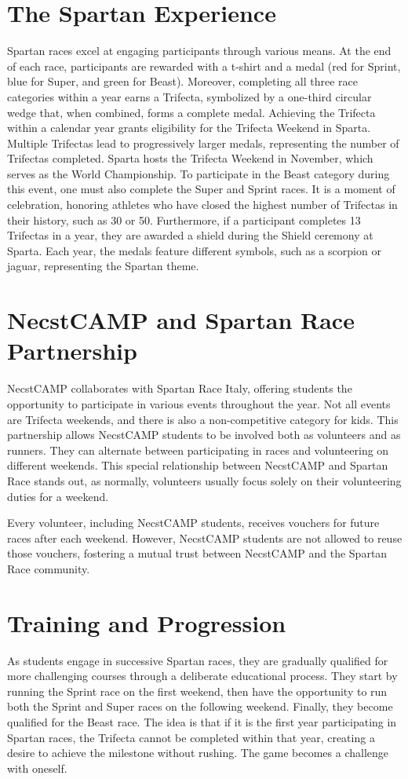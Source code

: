\documentclass[12pt,oneside,a4paper]{article}
\begin{document}
\section{The Spartan Experience} \label{sec:spexp}
Spartan races excel at engaging participants through various means. At the end of each race, participants are rewarded with a t-shirt and a medal (red for Sprint, blue for Super, and green for Beast). Moreover, completing all three race categories within a year earns a Trifecta, symbolized by a one-third circular wedge that, when combined, forms a complete medal. Achieving the Trifecta within a calendar year grants eligibility for the Trifecta Weekend in Sparta. Multiple Trifectas lead to progressively larger medals, representing the number of Trifectas completed. Sparta hosts the Trifecta Weekend in November, which serves as the World Championship. To participate in the Beast category during this event, one must also complete the Super and Sprint races. It is a moment of celebration, honoring athletes who have closed the highest number of Trifectas in their history, such as 30 or 50. Furthermore, if a participant completes 13 Trifectas in a year, they are awarded a shield during the Shield ceremony at Sparta. Each year, the medals feature different symbols, such as a scorpion or jaguar, representing the Spartan theme.

\section{NecstCAMP and Spartan Race Partnership} \label{sec:partn}
NecstCAMP collaborates with Spartan Race Italy, offering students the opportunity to participate in various events throughout the year. Not all events are Trifecta weekends, and there is also a non-competitive category for kids. This partnership allows NecstCAMP students to be involved both as volunteers and as runners. They can alternate between participating in races and volunteering on different weekends. This special relationship between NecstCAMP and Spartan Race stands out, as normally, volunteers usually focus solely on their volunteering duties for a weekend. 

Every volunteer, including NecstCAMP students, receives vouchers for future races after each weekend. However, NecstCAMP students are not allowed to reuse those vouchers, fostering a mutual trust between NecstCAMP and the Spartan Race community.

\section{Training and Progression} \label{sec:prog}
As students engage in successive Spartan races, they are gradually qualified for more challenging courses through a deliberate educational process. They start by running the Sprint race on the first weekend, then have the opportunity to run both the Sprint and Super races on the following weekend. Finally, they become qualified for the Beast race. The idea is that if it is the first year participating in Spartan races, the Trifecta cannot be completed within that year, creating a desire to achieve the milestone without rushing. The game becomes a challenge with oneself.
\end{document}
